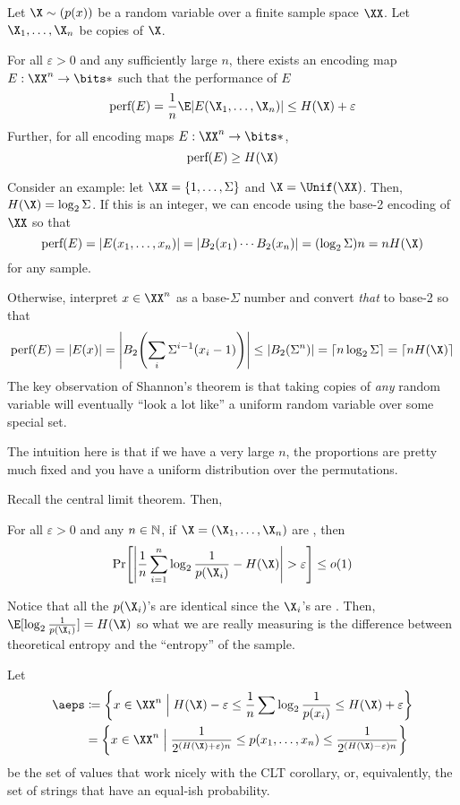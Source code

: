 \documentclass[class=co432,notes,tikz]{agony}
\begin{document}
\begin{theorem}
  Let $\X \sim (p(x))$ be a random variable over a finite sample space $\XX$.
  Let $\X_1,\dotsc,\X_n$ be \iid copies of $\X$.

  For all $\varepsilon > 0$ and any sufficiently large $n$,
  there exists an encoding map $E : \XX^n \to \bits*$
  such that the performance of $E$
  \[ \text{perf}(E) = \frac1n\E\abs{E(\X_1,\dotsc,\X_n)} \leq H(\X) + \varepsilon \]
  Further, for all encoding maps $E : \XX^n \to \bits*$,
  \[ \text{perf}(E) \geq H(\X) \]
\end{theorem}

Consider an example: let $\XX = \{1,\dotsc,\Sigma\}$ and $\X = \Unif(\XX)$.
Then, $H(\X) = \log_2\Sigma$.
If this is an integer, we can encode using the base-2 encoding of $\XX$
so that
\[
  \text{perf}(E)
  = \abs{E(x_1,\dotsc,x_n)} = \abs{B_2(x_1)\cdots B_2(x_n)}
  = (\log_2\Sigma)n = nH(\X)
\]
for any sample.

Otherwise, interpret $x \in \XX^n$ as a base-$\Sigma$ number
and convert \emph{that} to base-2 so that
\[
  \text{perf}(E)
  =\abs{E(x)}
  = \abs{B_2\qty(\sum_i \Sigma^{i-1} (x_i-1))}
  \leq \abs{B_2(\Sigma^n)}
  = \ceil{n\log_2\Sigma}
  = \ceil{nH(\X)}
\]
The key observation of Shannon's theorem
is that taking copies of \emph{any} random variable will eventually
``look a lot like'' a uniform random variable over some special set.

The intuition here is that if we have a very large $n$,
the proportions are pretty much fixed and you have a uniform distribution
over the permutations.

Recall the central limit theorem. Then,

\begin{corollary}
  For all $\varepsilon > 0$ and any $n \in \mathbb{N}$,
  if $\X = (\X_1,\dotsc,\X_n)$ are \iid, then
  \[ \Pr[\abs{\frac1n\sum_{i=1}^n\log_2\frac{1}{p(\X_i)} - H(\X)} > \varepsilon] \leq o(1) \]
\end{corollary}
Notice that all the $p(\X_i)$'s are identical since the $\X_i$'s are \iid.
Then, $\E[\log_2\frac{1}{p(\X_i)}] = H(\X)$ so what we are really measuring
is the difference between theoretical entropy and the ``entropy'' of the sample.

\begin{defn}
  Let
  \begin{align*}
    \aeps
     & \coloneqq \qty{x\in\XX^n \Bigm| H(\X) - \varepsilon \leq \frac1n\sum\log_2\frac{1}{p(x_i)} \leq H(\X) + \varepsilon}       \\
     & = \qty{x\in\XX^n \Bigm| \frac{1}{2^{(H(\X)+\varepsilon)n}} \leq p(x_1,\dotsc,x_n) \leq \frac{1}{2^{(H(\X)-\varepsilon)n}}}
  \end{align*}
  be the set of values that work nicely with the CLT corollary,
  or, equivalently, the set of strings that have an equal-ish probability.
\end{defn}
\end{document}
